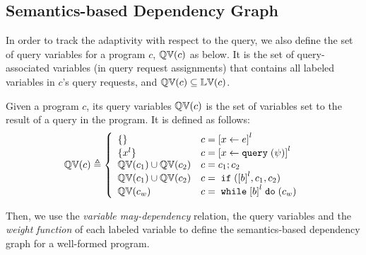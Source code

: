 \subsection{Semantics-based Dependency Graph}
\label{sec:design_choice}
In order to track the adaptivity with respect to the query,
we also define the set of query variables for a program $c$, $\mathbb{QV}(c)$ as below.
It is the set of query-associated variables (in query request assignments) that contains all labeled variables in $c$'s query requests, and $\mathbb{QV}(c) \subseteq \mathbb{LV}(c)$.
\begin{defn} 
 \label{def:qvar}
Given a program $c$, its query variables 
$\mathbb{QV}(c)$ is the set of variables set to the result of a query in the program.
It is defined as follows:
{
\[
 \qvar(c) \triangleq
 \left\{
 \begin{array}{ll}
 \{\} 
 & {c} = \clabel{\assign x \expr}^{l} 
 \\
 \{{x}^l\} 
 & {c} = \clabel{\assign x \query(\qexpr)}^{l} 
 \\
 \qvar(c_1) \cup \qvar(c_2) 
 & {c} = {c_1};{c_2}
 \\
 \qvar(c_1) \cup \qvar(c_2) 
 & {c} =\eif(\clabel{\bexpr}^{l}, c_1, c_2) 
 \\
 \qvar(c_w)
 & {c} = \ewhile \clabel{\bexpr}^{l} \edo (c_w)
\end{array}
\right.
\]
}
\end{defn}

Then, we use the \emph{variable may-dependency} relation, the query variables and the \emph{weight function}
of each labeled variable to 
define the semantics-based dependency graph for a well-formed program.

